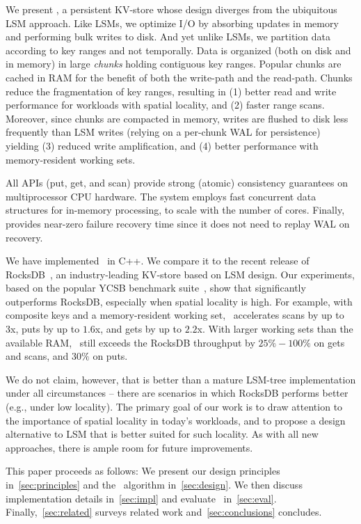 We present \sys, a persistent KV-store whose design diverges from the ubiquitous LSM approach.  
Like  LSMs,  we optimize I/O by absorbing updates in memory and performing bulk writes to disk. 
And yet unlike LSMs, we partition data according to key ranges and not temporally.
Data is  organized (both on disk and in memory) in large \emph{chunks} holding contiguous key ranges.
Popular chunks are cached in RAM for the benefit of  both the write-path and the read-path.
Chunks reduce the fragmentation of key ranges, resulting in 
(1) better read and write performance for workloads with spatial locality,  and
(2) faster range scans. 
Moreover, since chunks  are compacted in memory, writes are 
flushed to disk less frequently than LSM writes (relying on a per-chunk WAL for persistence)
yielding 
(3) reduced write amplification, and 
(4) better performance with memory-resident working sets.

All \sys\/ APIs (put, get, and scan) provide strong (atomic) consistency guarantees on multiprocessor CPU hardware. 
The system employs fast concurrent data structures for in-memory processing, to scale with the number of cores. 
Finally, \sys\/ provides near-zero failure recovery time since it does not need to replay WAL on recovery.

We have implemented \sys\ in C++. We compare it to the recent release of RocksDB~\cite{RocksDB}, 
an industry-leading KV-store  based on LSM design. Our experiments, based on the popular 
YCSB benchmark suite~\cite{YCSB}, show that \sys\/ significantly outperforms  RocksDB, 
especially when spatial  locality is high. 
For example, with composite keys and a memory-resident working set, \sys\  accelerates scans 
by up to 3x, puts by up to $1.6$x, and gets by up to $2.2$x. With larger working sets than the 
available RAM, \sys\ still exceeds the RocksDB throughput by $25\% - 100\%$ on gets  and scans, 
and $30\%$ on puts. 

We do not claim, however, that \sys\/ is better than a mature LSM-tree implementation
under all circumstances -- there are scenarios in which RocksDB performs better (e.g., under low locality). 
The primary goal of our work is to draw attention to the importance of spatial locality in 
today's workloads, and to propose a design alternative to LSM that is better suited for such locality. 
As with all new approaches, there is ample  room for future improvements. 
 
 This paper proceeds as follows:
We present our design principles in~\cref{sec:principles} and  the \sys\ algorithm 
in~\cref{sec:design}. We then discuss implementation details in~\cref{sec:impl} and evaluate 
\sys\ in~\cref{sec:eval}.  Finally,~\cref{sec:related}   surveys related work and~\cref{sec:conclusions}
concludes. 
